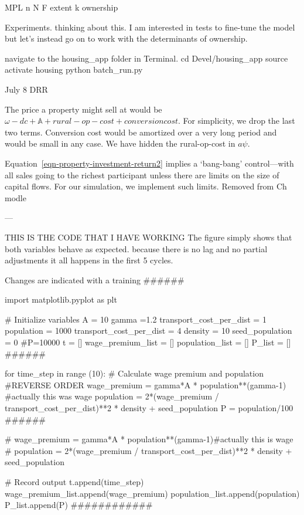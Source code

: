 MPL     n
N       F
extent  k   %
ownership       

Experiments. thinking about this. I am interested in tests to fine-tune the model but let's instead go on to work with the determinants of ownership. 



navigate to the housing_app folder in Terminal. cd Devel/housing_app
source activate housing
python batch_run.py


July 8 DRR

The price a property might sell at would be $\omega - {dc} + \mathbb{A} + rural-op-cost + conversion cost$. For simplicity, we drop the last two terms. Conversion cost would be amortized over a very long period and would be small in any case. We have hidden the rural-op-cost in $a\psi$.


Equation~\ref{eqn-property-investment-return2} implies a `bang-bang' control---with all sales going to the richest participant unless there are limits on the size of capital flows. For our simulation, we implement such limits.  Removed from Ch modle 


---

THIS IS THE CODE THAT I HAVE WORKING
The figure simply shows that both variables behave as expected.
because there is no lag and no partial adjustments it all happens in the first 5 cycles.


Changes are indicated with a training ######

import matplotlib.pyplot as plt

# Initialize variables
A     = 10
gamma =1.2
transport_cost_per_dist = 1
population = 1000
transport_cost_per_dist = 4
density = 10
seed_population = 0
#P=10000
t = []
wage_premium_list = []
population_list   = []
P_list            = []   ######

for time_step in range (10):
    # Calculate wage premium and population #REVERSE ORDER
    wage_premium = gamma*A * population**(gamma-1) #actually this was wage
    population =  2*(wage_premium / transport_cost_per_dist)**2 * density + seed_population
    P = population/100  ######
    
    # wage_premium = gamma*A * population**(gamma-1)#actually this is wage
    # population = 2*(wage_premium / transport_cost_per_dist)**2 * density + seed_population

    # Record output
    t.append(time_step)
    wage_premium_list.append(wage_premium)
    population_list.append(population)
    P_list.append(P)    ############


